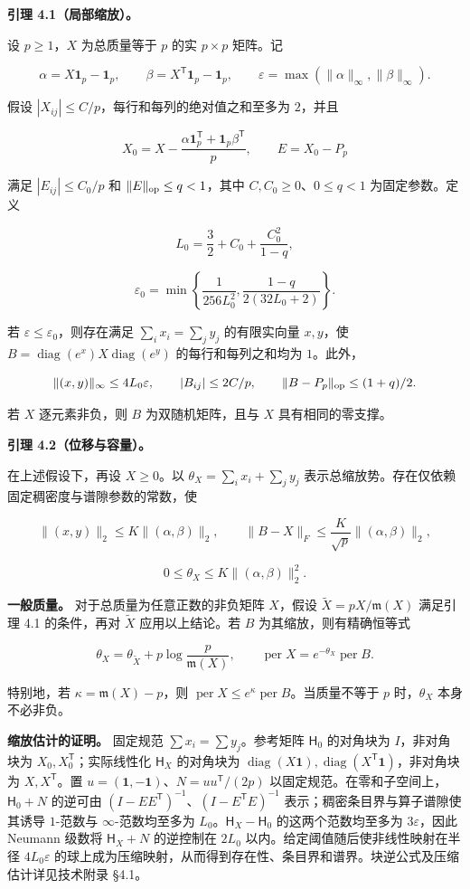 \documentclass[11pt,a4paper]{article}
\begin{document}
\textbf{引理 4.1（局部缩放）。}

设 \(p\ge1\)，\(X\) 为总质量等于 \(p\) 的实 \(p\times p\) 矩阵。记

\[
\alpha=X\mathbf 1_p-\mathbf 1_p,\qquad \beta=X^{\mathsf T}\mathbf 1_p-\mathbf 1_p,\qquad \varepsilon=\max(\|\alpha\|_\infty,\|\beta\|_\infty).
\]

假设 \(|X_{ij}|\le C/p\)，每行和每列的绝对值之和至多为 \(2\)，并且

\[
X_0=X-\frac{\alpha\mathbf 1_p^{\mathsf T}+\mathbf 1_p\beta^{\mathsf T}}p,\qquad E=X_0-P_p
\]

满足 \(|E_{ij}|\le C_0/p\) 和 \(\|E\|_{\rm op}\le q<1\)，其中 \(C,C_0\ge0\)、\(0\le q<1\) 为固定参数。定义

\[
L_0=\frac32+C_0+\frac{C_0^2}{1-q},
\]

\[
\varepsilon_0=\min\left\{\frac1{256L_0^2},\frac{1-q}{2(32L_0+2)}\right\}.
\]

若 \(\varepsilon\le\varepsilon_0\)，则存在满足 \(\sum_i x_i=\sum_j y_j\) 的有限实向量 \(x,y\)，使 \(B=\operatorname{diag}(e^x)X\operatorname{diag}(e^y)\) 的每行和每列之和均为 \(1\)。此外，

\[
\|(x,y)\|_\infty\le4L_0\varepsilon,\qquad |B_{ij}|\le2C/p,\qquad \|B-P_p\|_{\rm op}\le(1+q)/2.
\]

若 \(X\) 逐元素非负，则 \(B\) 为双随机矩阵，且与 \(X\) 具有相同的零支撑。

\textbf{引理 4.2（位移与容量）。}

在上述假设下，再设 \(X\ge0\)。以 \(\theta_X=\sum_i x_i+\sum_j y_j\) 表示总缩放势。存在仅依赖固定稠密度与谱隙参数的常数，使

\[
\|(x,y)\|_2\le K\|(\alpha,\beta)\|_2,\qquad \|B-X\|_F\le\frac K{\sqrt p}\|(\alpha,\beta)\|_2,
\]

\[
0\le\theta_X\le K\|(\alpha,\beta)\|_2^2.
\]

\textbf{一般质量。} 对于总质量为任意正数的非负矩阵 \(X\)，假设 \(\widetilde X=pX/\mathfrak m(X)\) 满足引理 4.1 的条件，再对 \(\widetilde X\) 应用以上结论。若 \(B\) 为其缩放，则有精确恒等式

\[
\theta_X=\theta_{\widetilde X}+p\log\frac p{\mathfrak m(X)},\qquad \operatorname{per}X=e^{-\theta_X}\operatorname{per}B.
\]

特别地，若 \(\kappa=\mathfrak m(X)-p\)，则 \(\operatorname{per}X\le e^\kappa\operatorname{per}B\)。当质量不等于 \(p\) 时，\(\theta_X\) 本身不必非负。

\textbf{缩放估计的证明。} 固定规范 \(\sum x_i=\sum y_j\)。参考矩阵 \(\mathsf H_0\) 的对角块为 \(I\)，非对角块为 \(X_0,X_0^{\mathsf T}\)；实际线性化 \(\mathsf H_X\) 的对角块为 \(\operatorname{diag}(X\mathbf1),\operatorname{diag}(X^{\mathsf T}\mathbf1)\)，非对角块为 \(X,X^{\mathsf T}\)。置 \(u=(\mathbf1,-\mathbf1)\)、\(N=uu^{\mathsf T}/(2p)\) 以固定规范。在零和子空间上，\(\mathsf H_0+N\) 的逆可由 \((I-EE^{\mathsf T})^{-1}\)、\((I-E^{\mathsf T}E)^{-1}\) 表示；稠密条目界与算子谱隙使其诱导 \(1\)-范数与 \(\infty\)-范数均至多为 \(L_0\)。\(\mathsf H_X-\mathsf H_0\) 的这两个范数均至多为 \(3\varepsilon\)，因此 Neumann 级数将 \(\mathsf H_X+N\) 的逆控制在 \(2L_0\) 以内。给定阈值随后使非线性映射在半径 \(4L_0\varepsilon\) 的球上成为压缩映射，从而得到存在性、条目界和谱界。块逆公式及压缩估计详见技术附录 §4.1。
\end{document}
